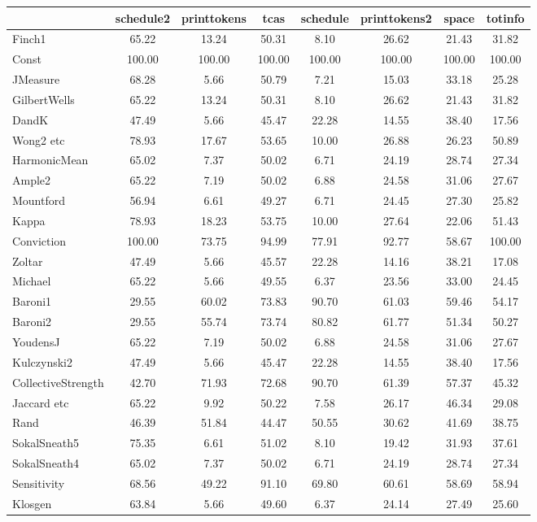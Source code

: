 \begin{tabular}{l||c|c|c|c|c|c|c}
& schedule2& printtokens& tcas& schedule& printtokens2& space& totinfo\\
\hline\hline
Finch1& 65.22& 13.24& 50.31& 8.10& 26.62& 21.43& 31.82\\
Const& 100.00& 100.00& 100.00& 100.00& 100.00& 100.00& 100.00\\
JMeasure& 68.28& 5.66& 50.79& 7.21& 15.03& 33.18& 25.28\\
GilbertWells& 65.22& 13.24& 50.31& 8.10& 26.62& 21.43& 31.82\\
DandK& 47.49& 5.66& 45.47& 22.28& 14.55& 38.40& 17.56\\
Wong2 etc& 78.93& 17.67& 53.65& 10.00& 26.88& 26.23& 50.89\\
HarmonicMean& 65.02& 7.37& 50.02& 6.71& 24.19& 28.74& 27.34\\
Ample2& 65.22& 7.19& 50.02& 6.88& 24.58& 31.06& 27.67\\
Mountford& 56.94& 6.61& 49.27& 6.71& 24.45& 27.30& 25.82\\
Kappa& 78.93& 18.23& 53.75& 10.00& 27.64& 22.06& 51.43\\
Conviction& 100.00& 73.75& 94.99& 77.91& 92.77& 58.67& 100.00\\
Zoltar& 47.49& 5.66& 45.57& 22.28& 14.16& 38.21& 17.08\\
Michael& 65.22& 5.66& 49.55& 6.37& 23.56& 33.00& 24.45\\
Baroni1& 29.55& 60.02& 73.83& 90.70& 61.03& 59.46& 54.17\\
Baroni2& 29.55& 55.74& 73.74& 80.82& 61.77& 51.34& 50.27\\
YoudensJ& 65.22& 7.19& 50.02& 6.88& 24.58& 31.06& 27.67\\
Kulczynski2& 47.49& 5.66& 45.47& 22.28& 14.55& 38.40& 17.56\\
CollectiveStrength& 42.70& 71.93& 72.68& 90.70& 61.39& 57.37& 45.32\\
Jaccard etc& 65.22& 9.92& 50.22& 7.58& 26.17& 46.34& 29.08\\
Rand& 46.39& 51.84& 44.47& 50.55& 30.62& 41.69& 38.75\\
SokalSneath5& 75.35& 6.61& 51.02& 8.10& 19.42& 31.93& 37.61\\
SokalSneath4& 65.02& 7.37& 50.02& 6.71& 24.19& 28.74& 27.34\\
Sensitivity& 68.56& 49.22& 91.10& 69.80& 60.61& 58.69& 58.94\\
Klosgen& 63.84& 5.66& 49.60& 6.37& 24.14& 27.49& 25.60\\

\end{tabular}
